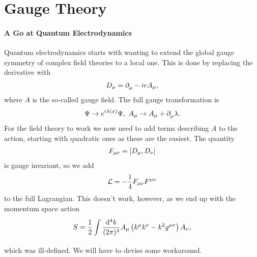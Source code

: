 \section{Gauge Theory}

\paragraph{A Go at Quantum Electrodynamics}
Quantum electrodynamics starts with wanting to extend the global gauge symmetry of complex field theories to a local one. This is done by replacing the derivative with
\begin{align*}
D_{\mu} = \partial^{}_{\mu} - ieA_{\mu},
\end{align*}
where $A$ is the so-called gauge field. The full gauge transformation is
\begin{align*}
\Psi\to e^{i\lambda(x)}\Psi,\ A_{\mu}\to A_{\mu} + \partial^{}_{\mu}\lambda.
\end{align*}
For the field theory to work we now need to add terms describing $A$ to the action, starting with quadratic ones as these are the easiest. The quantity
\begin{align*}
F_{\mu\nu} = \comm{D_{\mu}}{D_{\nu}}
\end{align*}
is gauge invariant, so we add
\begin{align*}
\mathcal{L} = -\frac{1}{4}F_{\mu\nu}F^{\mu\nu}
\end{align*}
to the full Lagrangian. This doesn't work, however, as we end up with the momentum space action
\begin{align*}
S = \frac{1}{2}\int\limits_{}^{}\frac{\dd[4]{k}}{(2\pi)^{4}}A_{\mu}\left(k^{\mu}k^{\nu} - k^{2}g^{\mu\nu}\right)A_{\nu},
\end{align*}
which was ill-defined. We will have to devise some workaround.

